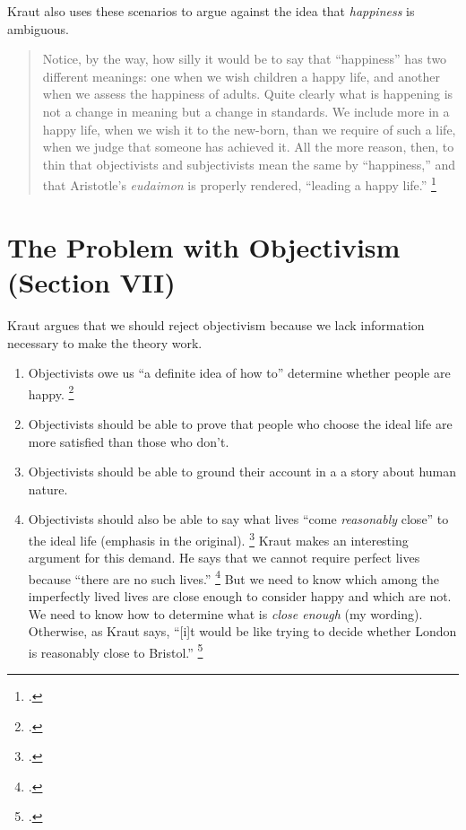 \documentclass[12pt,letterpaper]{article}
\begin{document}
Kraut also uses these scenarios to argue against the idea that \textit{happiness} is ambiguous.

\begin{quote}
    Notice, by the way, how silly it would be to say that ``happiness'' has two different meanings: one when we wish children a happy life, and another when we assess the happiness of adults. Quite clearly what is happening is not a change in meaning but a change in standards. We include more in a happy life, when we wish it to the new-born, than we require of such a life, when we judge that someone has achieved it. All the more reason, then, to thin that objectivists and subjectivists mean the same by ``happiness,'' and that Aristotle's \textit{eudaimon} is properly rendered, ``leading a happy life.''%
    \footcite[][189]{two-conceptions-of-happiness-kraut-1979}
\end{quote}

\section*{The Problem with Objectivism (Section VII)}

Kraut argues that we should reject objectivism because we lack information necessary to make the theory work.

\begin{enumerate}
    \item Objectivists owe us ``a definite idea of how to'' determine whether people are happy.%
    \footcite[][189]{two-conceptions-of-happiness-kraut-1979}
    \item Objectivists should be able to prove that people who choose the ideal life are more satisfied than those who don't.
    \item Objectivists should be able to ground their account in a a story about human nature.
    \item Objectivists should also be able to say what lives ``come \textit{reasonably} close'' to the ideal life (emphasis in the original).%
    \footcite[][190]{two-conceptions-of-happiness-kraut-1979}
    Kraut makes an interesting argument for this demand.
    He says that we cannot require perfect lives because ``there are no such lives.''%
    \footcite[][190]{two-conceptions-of-happiness-kraut-1979}
    But we need to know which among the imperfectly lived lives are close enough to consider happy and which are not.
    We need to know how to determine what is \textit{close enough} (my wording).
    Otherwise, as Kraut says, ``[i]t would be like trying to decide whether London is reasonably close to Bristol.''%
    \footcite[][190]{two-conceptions-of-happiness-kraut-1979}
\end{enumerate}
\end{document}
